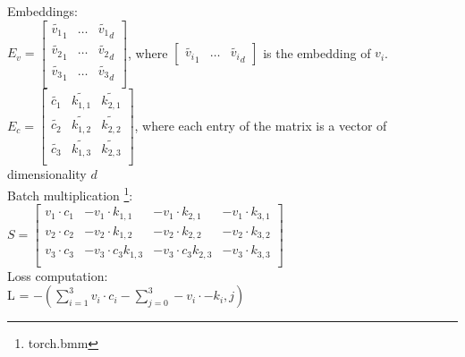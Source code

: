 Embeddings:\\
$E_v = \begin{bmatrix}
\tilde{v_1}_1 & \ldots & \tilde{v_1}_d\\
\tilde{v_2}_1 & \ldots & \tilde{v_2}_d\\
\tilde{v_3}_1 & \ldots & \tilde{v_3}_d\\
\end{bmatrix}
$, where $\begin{bmatrix}
\tilde{v_i}_1 & \ldots & \tilde{v_i}_d \end{bmatrix}$ is the embedding of $v_i$.  \\$E_c = \begin{bmatrix}
\tilde{c_1 }& \tilde{k_{1,1}} & \tilde{k_{2,1}} \\
\tilde{c_2 }& \tilde{k_{1,2}}& \tilde{k_{2,2}} \\
\tilde{c_3 }&\tilde{ k_{1,3} }& \tilde{k_{2,3}}\\
\end{bmatrix}$,
where each entry of the matrix is a vector of dimensionality $d$\\
Batch multiplication \footnote{torch.bmm}:\\
$S = \begin{bmatrix}
v_1 \cdot c_1 & -v_1 \cdot k_{1,1} & -v_1 \cdot  k_{2,1} & -v_1 \cdot  k_{3,1}\\
v_2 \cdot c_2 & -v_2 \cdot k_{1,2} & -v_2 \cdot k_{2,2} & -v_2 \cdot k_{3,2}\\
v_3 \cdot c_3 &-v_3 \cdot c_3  k_{1,3} & -v_3 \cdot c_3 k_{2,3}&-v_3 \cdot k_{3,3}\\
\end{bmatrix}$\\
Loss computation: \\
 L = $-(\sum_{i=1}^3 v_i \cdot c_i - \sum_{j=0}^3 -v_i \cdot -k_i,j)$

